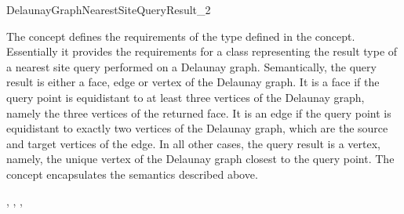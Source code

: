 


\begin{ccRefConcept}{DelaunayGraphNearestSiteQueryResult_2}

\ccDefinition

The concept  defines the
requirements of the  type defined in the
concept. Essentially it provides the requirements for a class
representing the result type of a nearest site query performed on a
Delaunay graph. Semantically, the query result is either a face, edge or
vertex of the Delaunay graph. It is a face if the query point is
equidistant to at least three vertices of the Delaunay graph, namely
the three vertices of the returned face. It is an edge if the query
point is equidistant to exactly two vertices of the Delaunay graph,
which are the source and target vertices of the edge. In all other
cases, the query result is a vertex, namely, the unique vertex of the
Delaunay graph closest to the query point. The
 concept encapsulates the semantics
described above.

\ccRefines
{}, , ,

\ccTypes
{}
%
{}
\ccGlue
{}
\ccGlue
{}


\end{ccRefConcept}
